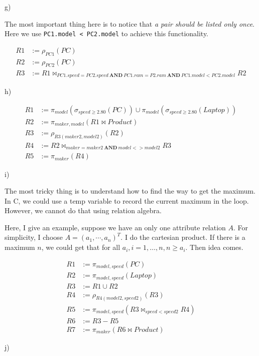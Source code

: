 \documentclass[../../main.tex]{subfiles}
\begin{document}
g)

The most important thing here is to notice that \emph{a pair
should be listed only once}. Here we use \verb|PC1.model < PC2.model|
to achieve this functionality.

\begin{align*}
  R1 &:= \rho_{PC1}(PC) \\
  R2 &:= \rho_{PC2}(PC) \\
  R3 &:= R1 \bowtie_{PC1.speed = PC2.speed \ \mathbf{AND} \ PC1.ram =
         P2.ram \ \mathbf{AND} \ PC1.model < PC2.model} R2
\end{align*}

h)

\begin{align*}
  R1 &:= \pi_{model}(\sigma_{speed \geq 2.80}(PC))
  \cup \pi_{model}(\sigma_{speed \geq 2.80}(Laptop)) \\
  R2 &:= \pi_{maker, model}(R1 \bowtie Product) \\
  R3 &:= \rho_{R3(maker2, model2)}(R2) \\
  R4 &:= R2 \bowtie_{maker = maker2 \ \mathbf{AND} \ model <> model2} R3 \\
  R5 &:= \pi_{maker}(R4)
\end{align*}

i)

The most tricky thing is to understand how to find the way to get
the maximum. In C, we could use a temp variable to record the
current maximum in the loop. However, we cannot do that using relation
algebra.

Here, I give an example, suppose we have an only one attribute relation
$A$. For simplicity, I choose $A = (a_{1}, \cdots, a_{n})^T$. I do the
cartesian product. If there is a maximum $n$, we could get that
for all $a_{i}, i = 1, \dots, n, n \geq a_{i}$. Then idea comes.

\begin{align*}
  R1 &:= \pi_{model, speed}(PC) \\
  R2 &:= \pi_{model, speed}(Laptop) \\
  R3 &:= R1 \cup R2 \\
  R4 &:= \rho_{R4(model2, speed2)}(R3) \\
  R5 &:= \pi_{model, speed}(R3 \bowtie_{speed < speed2} R4) \\
  R6 &:= R3 - R5 \\
  R7 &:= \pi_{maker}(R6 \bowtie Product)
\end{align*}

j)
\end{document}
